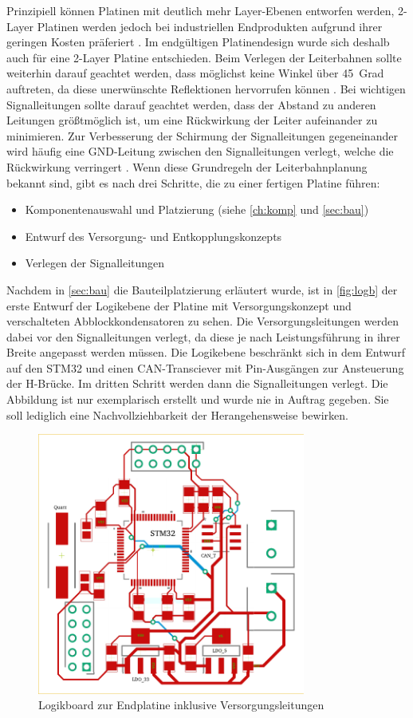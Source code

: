 Prinzipiell können Platinen mit deutlich mehr Layer-Ebenen entworfen werden, 2-Layer Platinen werden jedoch bei industriellen Endprodukten aufgrund ihrer geringen Kosten präferiert \cite[S.13]{emcdes}. Im endgültigen Platinendesign wurde sich deshalb auch für eine 2-Layer Platine entschieden. Beim Verlegen der Leiterbahnen sollte weiterhin darauf geachtet werden, dass möglichst keine Winkel über \SI{45}{Grad} auftreten, da diese unerwünschte Reflektionen hervorrufen können \cite[S.17]{emcdes}. Bei wichtigen Signalleitungen sollte darauf geachtet werden, dass der Abstand zu anderen Leitungen größtmöglich ist, um eine Rückwirkung der Leiter aufeinander zu minimieren. Zur Verbesserung der Schirmung der Signalleitungen gegeneinander wird häufig eine GND-Leitung zwischen den Signalleitungen verlegt, welche die Rückwirkung verringert \cite[S.45]{Franz2012}.
Wenn diese Grundregeln der Leiterbahnplanung bekannt sind, gibt es nach \cite[S.12]{emcdes} drei Schritte, die zu einer fertigen Platine führen:
\begin{itemize}
	\item Komponentenauswahl und Platzierung (siehe \autoref{ch:komp} und \autoref{sec:bau})
	\item Entwurf des Versorgung- und Entkopplungskonzepts
	\item Verlegen der Signalleitungen
\end{itemize}
Nachdem in \autoref{sec:bau} die Bauteilplatzierung erläutert wurde, ist in \autoref{fig:logb} der erste Entwurf der Logikebene der Platine mit Versorgungskonzept und verschalteten Abblockkondensatoren zu sehen. Die Versorgungsleitungen werden dabei vor den Signalleitungen verlegt, da diese je nach Leistungsführung in ihrer Breite angepasst werden müssen. Die Logikebene beschränkt sich in dem Entwurf auf den STM32 und einen CAN-Transciever mit Pin-Ausgängen zur Ansteuerung der H-Brücke. Im dritten Schritt werden dann die Signalleitungen verlegt. Die Abbildung ist nur exemplarisch erstellt und wurde nie in Auftrag gegeben. Sie soll lediglich eine Nachvollziehbarkeit der Herangehensweise bewirken.
\begin{figure}[H]%
\centering
\includegraphics[width=250pt]{./Bilder/logb}%
\caption{Logikboard zur Endplatine inklusive Versorgungsleitungen}%
\label{fig:logb}%
\end{figure}\noindent
